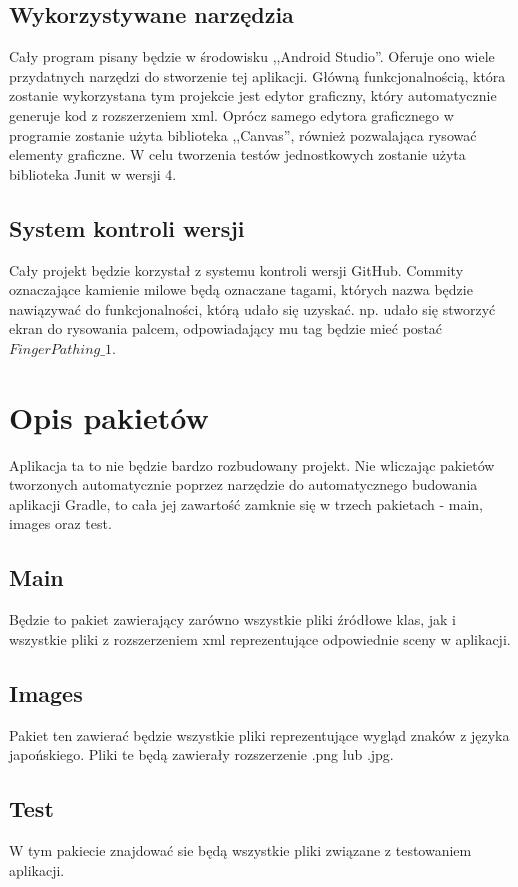 \documentclass[15pt]{article}
\begin{document}
  \subsection{Wykorzystywane narzędzia}
  Cały program pisany będzie w środowisku ,,Android Studio''. Oferuje ono wiele przydatnych narzędzi do stworzenie tej aplikacji. Główną funkcjonalnością, która zostanie wykorzystana tym projekcie jest edytor graficzny, który automatycznie generuje kod z rozszerzeniem xml. Oprócz samego edytora graficznego w programie zostanie użyta biblioteka ,,Canvas'', również pozwalająca rysować elementy graficzne. W celu tworzenia testów jednostkowych zostanie użyta biblioteka Junit w wersji 4. 
  
  \subsection{System kontroli wersji}
  Cały projekt będzie korzystał z systemu kontroli wersji GitHub.
  Commity oznaczające kamienie milowe będą oznaczane tagami,
  których nazwa będzie nawiązywać do funkcjonalności, którą udało się uzyskać. 
  \newline 
  \newline
  np. udało się stworzyć ekran do rysowania palcem, odpowiadający mu tag będzie mieć postać $FingerPathing\_1.$
  \section{Opis pakietów}
  Aplikacja ta to nie będzie bardzo rozbudowany projekt. Nie wliczając pakietów tworzonych automatycznie poprzez narzędzie do automatycznego budowania aplikacji Gradle, to cała jej zawartość zamknie się w trzech pakietach - main, images oraz test. 
  
  
  \subsection{Main}
  Będzie to pakiet zawierający zarówno wszystkie pliki źródłowe klas, jak i wszystkie pliki z rozszerzeniem xml reprezentujące odpowiednie sceny w aplikacji.
  
  \subsection{Images}
  Pakiet ten zawierać będzie wszystkie pliki reprezentujące wygląd znaków z języka japońskiego. Pliki te będą zawierały rozszerzenie .png lub .jpg.
  \subsection{Test}
  W tym pakiecie znajdować sie będą wszystkie pliki związane z testowaniem aplikacji. 
  \newpage
\end{document}
